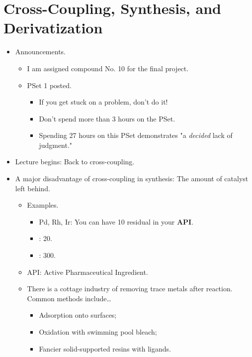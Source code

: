 \documentclass[../notes.tex]{subfiles}
\begin{document}
\section{Cross-Coupling, Synthesis, and Derivatization}
\begin{itemize}
    \item {}Announcements.
    \begin{itemize}
        \item I am assigned compound No. 10 for the final project.
        \item PSet 1 posted.
        \begin{itemize}
            \item If you get stuck on a problem, don't do it!
            \item Don't spend more than 3 hours on the PSet.
            \item Spending 27 hours on this PSet demonstrates "a \emph{decided} lack of judgment."
        \end{itemize}
    \end{itemize}
    \item Lecture begins: Back to cross-coupling.
    \pagebreak
    \item A major disadvantage of cross-coupling in synthesis: The amount of catalyst left behind.
    \begin{itemize}
        \item Examples.
        \begin{itemize}
            \item Pd, Rh, Ir: You can have \SI{10}{\partspermillion} residual in your \textbf{API}.
            \item {}: \SI{20}{\partspermillion}.
            \item {}: \SI{300}{\partspermillion}.
        \end{itemize}
        \item API: Active Pharmaceutical Ingredient.
        \item There is a cottage industry of removing trace metals after reaction. Common methods include\dots
        \begin{itemize}
            \item Adsorption onto surfaces;
            \item Oxidation with swimming pool bleach;
            \item Fancier solid-supported resins with ligands.
        \end{itemize}
    \end{itemize}

\end{itemize}
\end{document}
